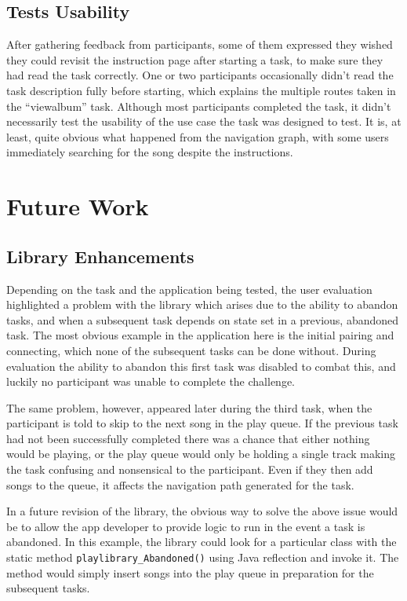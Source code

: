 \subsection{Tests Usability}

After gathering feedback from participants, some of them expressed they wished they
could revisit the instruction page after starting a task, to make sure they
had read the task correctly. One or two participants occasionally didn't
read the task description fully before starting, which explains the multiple
routes taken in the ``viewalbum'' task. Although most participants completed the
task, it didn't necessarily test the usability of the use case the task was designed
to test. It is, at least, quite obvious what happened from the navigation graph,
with some users immediately searching for the song despite the instructions.

\section{Future Work}

\subsection{Library Enhancements}

Depending on the task and the application being tested, the user 
evaluation highlighted a problem with the library which arises
due to the ability to abandon tasks, and when a subsequent task
depends on state set in a previous, abandoned task. The most 
obvious example in the application here is the initial pairing
and connecting, which none of the subsequent tasks can be done
without. During evaluation the ability to abandon this first task
was disabled to combat this, and luckily no participant was unable
to complete the challenge.

The same problem, however, appeared later during the third task, when
the participant is told to skip to the next song in the play queue.
If the previous task had not been successfully completed there was a
chance that either nothing would be playing, or the play queue would
only be holding a single track making the task confusing and nonsensical
to the participant. Even if they then add songs to the queue, it affects
the navigation path generated for the task.

In a future revision of the library, the obvious way to solve the above issue
would be to allow the app developer to provide logic to run in the event
a task is abandoned. In this example, the library could look for a
particular class with the static method \verb/playlibrary_Abandoned()/
using Java reflection and invoke it. The method would simply insert
songs into the play queue in preparation for the subsequent tasks.

